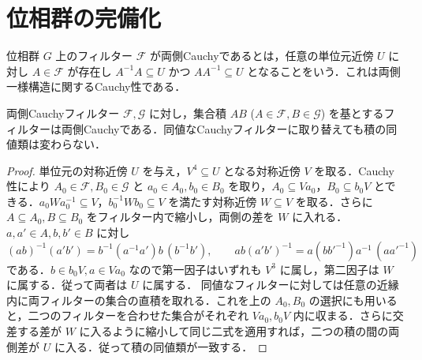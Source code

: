 \section{位相群の完備化}
\begin{defn}[両側Cauchyフィルター]
位相群 $G$ 上のフィルター $\mathcal F$ が両側Cauchyであるとは，任意の単位元近傍 $U$ に対し $A\in\mathcal F$ が存在し $A^{-1}A\subseteq U$ かつ $AA^{-1}\subseteq U$ となることをいう．これは両側一様構造に関するCauchy性である．
\end{defn}
\begin{prop}[Cauchyフィルターの積]
両側Cauchyフィルター $\mathcal F,\mathcal G$ に対し，集合積 $AB$ ($A\in\mathcal F,B\in\mathcal G$) を基とするフィルターは両側Cauchyである．同値なCauchyフィルターに取り替えても積の同値類は変わらない．
\end{prop}
\begin{proof}
単位元の対称近傍 $U$ を与え，$V^4\subseteq U$ となる対称近傍 $V$ を取る．Cauchy性により $A_0\in\mathcal F,B_0\in\mathcal G$ と $a_0\in A_0,b_0\in B_0$ を取り，$A_0\subseteq Va_0$，$B_0\subseteq b_0V$ とできる．$a_0 W a_0^{-1}\subseteq V$，$b_0^{-1}Wb_0\subseteq V$ を満たす対称近傍 $W\subseteq V$ を取る．さらに $A\subseteq A_0,B\subseteq B_0$ をフィルター内で縮小し，両側の差を $W$ に入れる．$a,a'\in A,b,b'\in B$ に対し
\[
(ab)^{-1}(a'b')=b^{-1}(a^{-1}a')b\,(b^{-1}b'),\qquad
ab(a'b')^{-1}=a(bb'^{-1})a^{-1}\,(aa'^{-1})
\]
である．$b\in b_0V,a\in Va_0$ なので第一因子はいずれも $V^3$ に属し，第二因子は $W$ に属する．従って両者は $U$ に属する．
同値なフィルターに対しては任意の近縁内に両フィルターの集合の直積を取れる．これを上の $A_0,B_0$ の選択にも用いると，二つのフィルターを合わせた集合がそれぞれ $Va_0,b_0V$ 内に収まる．さらに交差する差が $W$ に入るように縮小して同じ二式を適用すれば，二つの積の間の両側差が $U$ に入る．従って積の同値類が一致する．
\end{proof}

